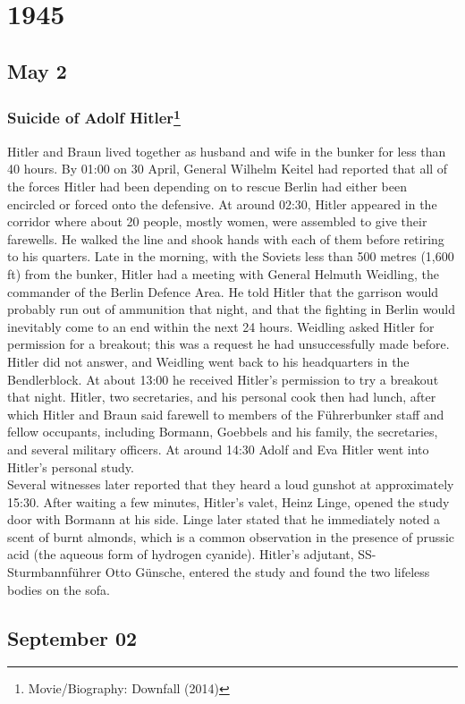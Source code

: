 \documentclass[11pt]{report}
\begin{document}
\chapter{1945}
\section{May 2}
\subsection{Suicide of Adolf Hitler\protect\footnote{Movie/Biography: Downfall (2014)}}
Hitler and Braun lived together as husband and wife in the bunker for less than 40 hours. By 01:00 on 30 April, General Wilhelm Keitel had reported that all of the forces Hitler had been depending on to rescue Berlin had either been encircled or forced onto the defensive. At around 02:30, Hitler appeared in the corridor where about 20 people, mostly women, were assembled to give their farewells. He walked the line and shook hands with each of them before retiring to his quarters. Late in the morning, with the Soviets less than 500 metres (1,600 ft) from the bunker, Hitler had a meeting with General Helmuth Weidling, the commander of the Berlin Defence Area. He told Hitler that the garrison would probably run out of ammunition that night, and that the fighting in Berlin would inevitably come to an end within the next 24 hours. Weidling asked Hitler for permission for a breakout; this was a request he had unsuccessfully made before. Hitler did not answer, and Weidling went back to his headquarters in the Bendlerblock. At about 13:00 he received Hitler's permission to try a breakout that night. Hitler, two secretaries, and his personal cook then had lunch, after which Hitler and Braun said farewell to members of the Führerbunker staff and fellow occupants, including Bormann, Goebbels and his family, the secretaries, and several military officers. At around 14:30 Adolf and Eva Hitler went into Hitler's personal study.\\
\indent Several witnesses later reported that they heard a loud gunshot at approximately 15:30. After waiting a few minutes, Hitler's valet, Heinz Linge, opened the study door with Bormann at his side. Linge later stated that he immediately noted a scent of burnt almonds, which is a common observation in the presence of prussic acid (the aqueous form of hydrogen cyanide). Hitler's adjutant, SS-Sturmbannführer Otto Günsche, entered the study and found the two lifeless bodies on the sofa. 
\section{September 02}
\end{document}
